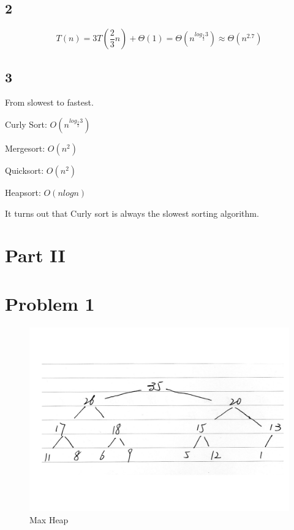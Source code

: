 \documentclass{article}
\begin{document}
  \subsection*{2}
    $$T(n) = 3T(\frac{2}{3}n) + \Theta(1) = \Theta(n^{log_\frac{3}{2}3}) \approx \Theta(n^{2.7})$$
  \subsection*{3}
    \par From slowest to fastest.
    \par Curly Sort: $O(n^{log_\frac{3}{2}3})$
    \par Mergesort: $O(n^2)$
    \par Quicksort: $O(n^2)$
    \par Heapsort:  $O(nlogn)$
    \par It turns out that Curly sort is always the slowest sorting algorithm.


\newpage
\section*{Part II}
\section*{Problem 1}
  \begin{figure}[h]
    \includegraphics[width=\textwidth]{Pic/Part2_Prob1_Heap.pdf}
    \caption{Max Heap}
  \end{figure}
\end{document}
